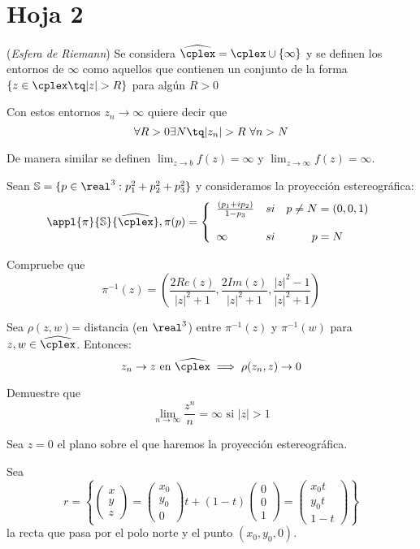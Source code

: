 \section{Hoja 2}
\begin{problem}[1]
(\textit{Esfera de Riemann}) Se considera $\widehat{\cplex} = \cplex \cup \{\infty\}$ y se definen los entornos de $\infty$ como aquellos que contienen un conjunto de la forma $\{z \in \cplex \tq |z|>R\}$ para algún $R > 0$

Con estos entornos $z_n \to \infty$ quiere decir que
\[\forall R > 0 \exists N \tq |z_n| > R \ \forall n > N\]

De manera similar se definen $\lim_{z \to b} f(z)= \infty$ y $\lim_{z \to \infty}f(z)=\infty$.

Sean $\mathbb{S}= \{p \in \real^3 : p_1^2+p_2^2+p_3^2\}$ y consideramos la proyección estereográfica:
\[\appl{\pi}{\mathbb{S}}{\widehat{\cplex}}, \pi(p) = \left\{
\begin{array}{lcc}
    \frac{(p_1+ip_2)}{1-p_3} & si & p \neq N = (0,0,1) \\
 \\ \infty & si & p = N
 \end{array} \right.\]

 \ppart
 Compruebe que
 \[\pi^{-1}(z)=\left( \frac{2Re(z)}{|z|^2+1}, \frac{2Im(z)}{|z|^2+1}, \frac{|z|^2-1}{|z|^2+1}\right)\]

 \ppart
 Sea $\rho(z,w)$= distancia (en $\real^3$) entre $\pi^{-1}(z)$ y $\pi^{-1}(w)$ para $z,w \in \widehat{\cplex}$. Entonces:
 \[z_n \to z \text{ en } \widehat{\cplex} \implies \rho(z_n,z) \to 0\]

 \ppart
 Demuestre que
 \[\lim_{n \to \infty}\frac{z^n}{n} = \infty \text{ si } |z| > 1\]

\solution
{}

\spart

Sea $z=0$ el plano sobre el que haremos la proyección estereográfica.

Sea
\[r=\left\{
\begin{pmatrix}x\\y\\z\end{pmatrix} =  \begin{pmatrix}x_0\\y_0\\0\end{pmatrix} t + (1-t) \begin{pmatrix}0\\0\\1\end{pmatrix} = \begin{pmatrix}x_0t\\y_0t\\1-t\end{pmatrix}
\right\}\]
la recta que pasa por el polo norte y el punto $(x_0,y_0,0)$.


\end{problem}
